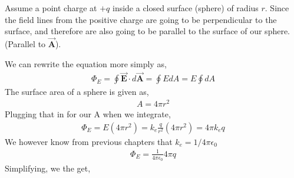 \documentclass[12pt, titlepage, oneside]{article}
\let\oldvec\vec
\renewcommand{\vec}[1]{\oldvec{\bm{#1}}}
\begin{document}
Assume a point charge at $+q$ inside a closed surface (sphere) of radius $r$. Since the field lines from the positive charge are going to be perpendicular to the surface, and therefore are also going to be parallel to the surface of our sphere. (Parallel to $\vec{A}$). 

We can rewrite the equation more simply as,
\begin{align*}
	\Phi_E = \oint \vec{E} \cdot d\vec{A} = \oint E dA = E \oint dA
\end{align*}
The surface area of a sphere is given as, 
\begin{align*}
A = 4\pi r^2
\end{align*}
Plugging that in for our A when we integrate,
\begin{align*}
\Phi_E = E (4 \pi r^2) = k_e \frac{q}{r^2}(4\pi r^2) = 4\pi k_e q
\end{align*}
We however know from previous chapters that $k_e = 1/4\pi \epsilon_0$
\begin{align*}
	\Phi_E = \frac{1}{4\pi \epsilon_0}4\pi q
\end{align*} 
Simplifying, we the get,\\
\end{document}
